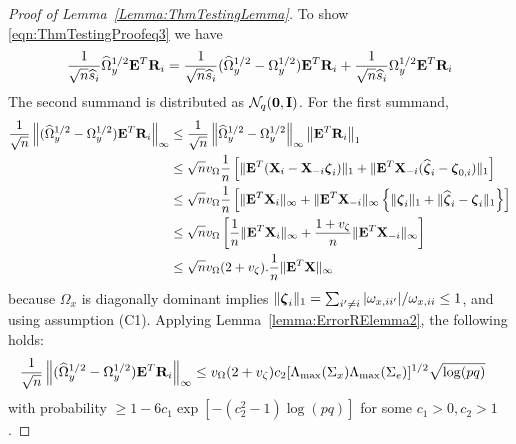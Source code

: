 \begin{proof}[Proof of Lemma~\ref{Lemma:ThmTestingLemma}]
To show \eqref{eqn:ThmTestingProofeq3} we have
%
\begin{align*}
\frac{1}{\sqrt n \widehat s_i}  \widehat \Omega_y^{1/2} {\mathbf{E}}^T {\mathbf{R}}_i =
\frac{1}{\sqrt n \widehat s_i}  (\widehat \Omega_y^{1/2} - \Omega_y^{1/2}) {\mathbf{E}}^T {\mathbf{R}}_i +
\frac{1}{\sqrt n \widehat s_i}  \Omega_y^{1/2} {\mathbf{E}}^T {\mathbf{R}}_i
\end{align*}
%
The second summand is distributed as ${\cal{N}}_q ({\bf 0}, {\mathbf{I}})$. For the first summand,
%
\begin{align*}
\frac{1}{\sqrt n}  \left\| (\widehat \Omega_y^{1/2} - \Omega_y^{1/2}) {\mathbf{E}}^T {\mathbf{R}}_i \right\|_\infty & \leq
\frac{1}{\sqrt n}  \left\| \widehat \Omega_y^{1/2} - \Omega_y^{1/2} \right\|_\infty  \left\| {\mathbf{E}}^T {\mathbf{R}}_i \right\|_1 \\
& \leq \sqrt n v_\Omega \frac{1}{n} \left[ \| {\mathbf{E}}^T ({\mathbf{X}}_i -  {\mathbf{X}}_{-i} {\boldsymbol{\zeta}}_i ) \|_1 + \| {\mathbf{E}}^T {\mathbf{X}}_{-i} (\widehat {{\boldsymbol{\zeta}}}_i - {\boldsymbol{\zeta}}_{0,i} ) \|_1 \right] \\
& \leq \sqrt n v_\Omega \frac{1}{n} \left[ \| {\mathbf{E}}^T {\mathbf{X}}_i \|_\infty + \| {\mathbf{E}}^T {\mathbf{X}}_{-i} \|_\infty
\left\{ \| {\boldsymbol{\zeta}}_i  \|_1 + \| \widehat {{\boldsymbol{\zeta}}}_i - {\boldsymbol{\zeta}}_i  \|_1 \right\} \right] \notag\\
& \leq \sqrt n v_\Omega \left[ \frac{1}{n} \| {\mathbf{E}}^T {\mathbf{X}}_i \|_\infty + 
\frac{1 + v_\zeta}{n} \| {\mathbf{E}}^T {\mathbf{X}}_{-i} \|_\infty \right] \\
& \leq \sqrt n v_\Omega (2 + v_\zeta) .\frac{1}{n} \| {\mathbf{E}}^T {\mathbf{X}} \|_\infty
\end{align*}
%
because $\Omega_x$ is diagonally dominant implies $\| {\boldsymbol{\zeta}}_i \|_1 = \sum_{i' \neq i} |\omega_{x,ii'}|/ \omega_{x,ii} \leq 1$, and using assumption (C1). Applying Lemma~\ref{lemma:ErrorRElemma2}, the following holds:
%
\begin{align}\label{eqn:ThmTestingProofeq31}
\frac{1}{\sqrt n}  \left\| (\widehat \Omega_y^{1/2} - \Omega_y^{1/2}) {\mathbf{E}}^T {\mathbf{R}}_i \right\|_\infty & \leq v_\Omega (2 + v_\zeta) c_2 [ \Lambda_{\max} (\Sigma_x) \Lambda_{\max} (\Sigma_e) ]^{1/2} \sqrt{ \log(pq)}
\end{align}
%
with probability $ \geq 1 - 6c_1 \exp [-(c_2^2-1) \log(pq)]$ for some $c_1 >0, c_2 > 1$.


\end{proof}
